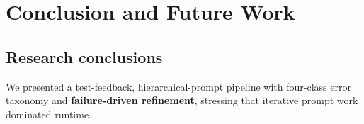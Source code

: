 \documentclass[12pt]{llncs}
\begin{document}











\section{Conclusion and Future Work}
\subsection{Research conclusions}
We presented a test-feedback, hierarchical-prompt pipeline with four-class error taxonomy and \textbf{failure-driven refinement}, stressing that iterative prompt work dominated runtime.
\end{document}
